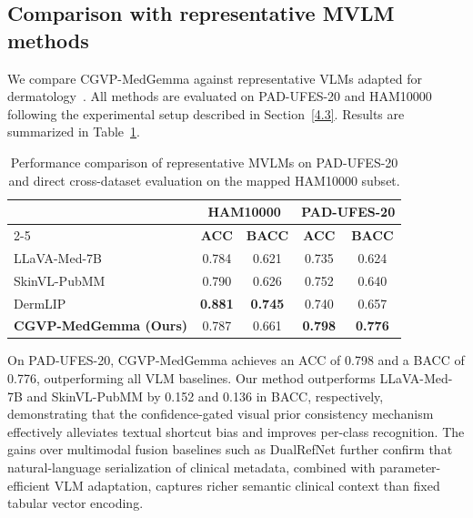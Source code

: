 \documentclass[preprint,12pt]{elsarticle}
\makeatletter
\def@NAT@last@yr{--\NAT@penalty}%
\makeatother
\begin{document}
\subsection{Comparison with representative MVLM methods}
We compare CGVP-MedGemma against representative VLMs adapted for dermatology~\cite{li2023llavamed,zeng2025mmskin,yan2025derm1m}. All methods are evaluated on PAD-UFES-20 and HAM10000 following the experimental setup described in Section~\ref{4.3}. Results are summarized in Table~\ref{table3}.

\begin{table}[!htbp]
	\centering
	\renewcommand{\arraystretch}{1.15}
	\caption{Performance comparison of representative MVLMs on PAD-UFES-20 and direct cross-dataset evaluation on the mapped HAM10000 subset.}
	\vspace{1pt}
	\setlength{\tabcolsep}{4pt}
	\small
	\begin{tabular}{l|cc|cc}
		\hline
		\multirow{2}{*}{\diagbox[width=13.5em,height=2\baselineskip]{\textbf{Methods}}{\textbf{Dataset}}} 
		& \multicolumn{2}{c|}{\textbf{HAM10000}} 
		& \multicolumn{2}{c}{\textbf{PAD-UFES-20}} \\
		\cline{2-5}
		& \textbf{ACC} & \textbf{BACC} 
		& \textbf{ACC} & \textbf{BACC} \\
		\hline
		LLaVA-Med-7B\cite{li2023llavamed} 
		& 0.784 & 0.621 & 0.735 & 0.624 \\
		SkinVL-PubMM\cite{zeng2025mmskin} 
		& 0.790 & 0.626 & 0.752 & 0.640 \\
		DermLIP\cite{yan2025derm1m} 
		& \textbf{0.881} & \textbf{0.745} & 0.740 & 0.657 \\
		\textbf{CGVP-MedGemma (Ours)} 
		& 0.787 & 0.661 & \textbf{0.798} & \textbf{0.776} \\
		\hline
	\end{tabular}
	\label{table3}
\end{table}

On PAD-UFES-20, CGVP-MedGemma achieves an ACC of 0.798 and a BACC of 0.776, outperforming all VLM baselines. Our method outperforms LLaVA-Med-7B and SkinVL-PubMM by 0.152 and 0.136 in BACC, respectively, demonstrating that the confidence-gated visual prior consistency mechanism effectively alleviates textual shortcut bias and improves per-class recognition. The gains over multimodal fusion baselines such as DualRefNet further confirm that natural-language serialization of clinical metadata, combined with parameter-efficient VLM adaptation, captures richer semantic clinical context than fixed tabular vector encoding.
\end{document}
